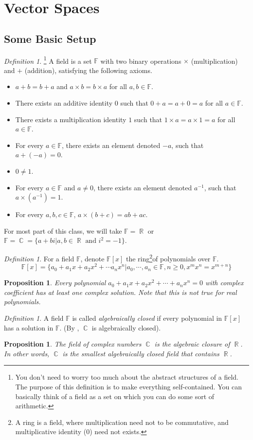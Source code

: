 \documentclass[12pt]{amsart}
\newcommand{\fff}[0]{\mathbb{F}}
\renewcommand{\geq}{\geqslant}
\DeclareMathOperator{\rr}{\mathbb{R}}
\DeclareMathOperator{\cc}{\mathbb{C}}
\newtheorem{proposition}[theorem]{Proposition}
\theoremstyle{remark}
\newtheorem{definition}[theorem]{Definition}
\numberwithin{equation}{section}
\begin{document}
\section{Vector Spaces}
\subsection{Some Basic Setup}
\begin{definition}\footnote{You don't need to worry too much about the abstract structures of a field. The purpose of this definition is to make everything self-contained. You can basically think of a field as a set on which you can do some sort of arithmetic.}
	A field is a set $\fff$ with two binary operations $\times$ (multiplication) and $+$ (addition), satisfying the following axioms.
	\begin{itemize}
	    \item $a+b=b+a$ and $a\times b = b\times a$ for all $a,b\in\fff$.
		\item There exists an additive identity $0$ such that $0+a=a+0 = a$ for all $a\in\fff$.
		\item There exists a multiplication identity $1$ such that $1\times a= a\times 1=a$ for all $a\in\fff$.
		\item For every $a\in\fff$, there exists an element denoted $-a$, such that $a+(-a)=0$.
		\item $0\neq 1$.
		\item For every $a\in\fff$ and $a\neq 0$, there exists an element denoted $a^{-1}$, such that $a\times (a^{-1})=1$.
		\item For every $a,b,c\in\fff$, $a\times (b+c)=ab+ac$.
	\end{itemize}
For most part of this class, we will take $\fff=\rr $  or $\fff=\cc=\{a+bi|a,b\in\rr\text{ and }i^2 = -1\}$.
\end{definition}
\begin{definition}
	For a field $\fff$, denote $\fff[x]$ the ring\footnote{A ring is a field, where multiplication need not to be commutative, and multiplicative identity ($0$) need not exists.}of polynomials over $\fff$. 
	\[\fff[x]=\{a_0+a_1x+a_2x^2+\cdots a_nx^n|a_0,\cdots,a_n\in \fff,n\geq 0, x^mx^n=x^{m+n}\}\]\end{definition} 
\begin{proposition}\label{prop:C_alg_close}
	Every polynomial $a_0+a_1x+a_2x^2+\cdots+a_nx^n = 0$ with complex coefficient has at least one complex solution. Note that this is not true for real polynomials.
\end{proposition}
\begin{definition}
	A field $\fff$ is called \emph{algebraically closed} if every polynomial in $\fff[x]$ has a solution in $\fff$. (By , $\cc$ is algebraically closed).
\end{definition}
\begin{proposition}
	The field of complex numbers $\cc$ is the algebraic closure of $\rr$. In other words, $\cc$ is the smallest algebraically closed field that contains $\rr$.
\end{proposition}
\end{document}
